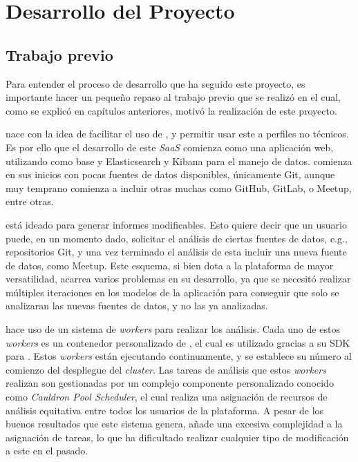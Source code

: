 
\chapter{Desarrollo del Proyecto} %

\label{Chapter3} %


\section{Trabajo previo}

Para entender el proceso de desarrollo que ha seguido este proyecto, es importante hacer un pequeño repaso al trabajo previo que se realizó en  el cual, como se explicó en capítulos anteriores, motivó la realización de este proyecto.

 nace con la idea de facilitar el uso de , y permitir usar este a perfiles no técnicos. Es por ello que el desarrollo de este \emph{SaaS} comienza como una aplicación web, utilizando  como base y Elasticsearch y Kibana para el manejo de datos.  comienza en sus inicios con pocas fuentes de datos disponibles, únicamente Git, aunque muy temprano comienza a incluir otras muchas como GitHub, GitLab, o Meetup, entre otras.

 está ideado para generar informes modificables. Esto quiere decir que un usuario puede, en un momento dado, solicitar el análisis de ciertas fuentes de datos, e.g., repositorios Git, y una vez terminado el análisis de esta incluir una nueva fuente de datos, como Meetup. Este esquema, si bien dota a la plataforma de mayor versatilidad, acarrea varios problemas en su desarrollo, ya que se necesitó realizar múltiples iteraciones en los modelos de la aplicación para conseguir que solo se analizaran las nuevas fuentes de datos, y no las ya analizadas.

 hace uso de un sistema de \emph{workers} para realizar los análisis. Cada uno de estos \emph{workers} es un contenedor personalizado de , el cual es utilizado gracias a su SDK para . Estos \emph{workers} están ejecutando continuamente, y se establece su número al comienzo del despliegue del \emph{cluster}. Las tareas de análisis que estos \emph{workers} realizan son gestionadas por un complejo componente personalizado conocido como \emph{Cauldron Pool Scheduler}, el cual realiza una asignación de recursos de análisis equitativa entre todos los usuarios de la plataforma. A pesar de los buenos resultados que este sistema genera, añade una excesiva complejidad a la asignación de tareas, lo que ha dificultado realizar cualquier tipo de modificación a este en el pasado.


